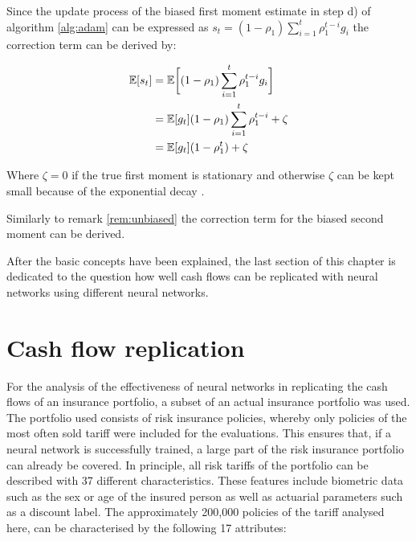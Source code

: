 \begin{remark}\label{rem:unbiased}
	Since the update process of the biased first moment estimate in step d) of algorithm \ref{alg:adam} can be expressed as $s_t = (1 - \rho_1) \sum_{i = 1}^t \rho_1^{t-i} g_i$ the correction term can be derived by:
	
	\begin{align*}
		\mathbb{E}[s_t] &= \mathbb{E} \bigg[ (1 - \rho_1) \sum_{i = 1}^t \rho_1^{t-i} g_i \bigg] \\
				&= \mathbb{E}[g_t] (1 - \rho_1)  \sum_{i = 1}^t \rho_1^{t-i} + \zeta \\
				&= \mathbb{E}[g_t] (1 - \rho_1^t) + \zeta
	\end{align*}
	
	Where $\zeta = 0 $ if the true first moment is stationary and otherwise $\zeta$ can be kept small because of the exponential decay \cite{kingma2014adam}.
\end{remark}

\begin{remark}
	Similarly to remark \ref{rem:unbiased} the correction term for the biased second moment can be derived.
\end{remark}

After the basic concepts have been explained, the last section of this chapter is dedicated to the question how well cash flows can be replicated with neural networks using different neural networks. 


\section{Cash flow replication}

For the analysis of the effectiveness of neural networks in replicating the cash flows of an insurance portfolio, a subset of an actual insurance portfolio was used. The portfolio used consists of risk insurance policies, whereby only policies of the most often sold tariff were included for the evaluations. This ensures that, if a neural network is successfully trained, a large part of the risk insurance portfolio can already be covered. In principle, all risk tariffs of the portfolio can be described with 37 different characteristics. These features include biometric data such as the sex or age of the insured person as well as actuarial parameters such as a discount label. The approximately 200,000 policies of the tariff analysed here, can be characterised by the following 17 attributes:

